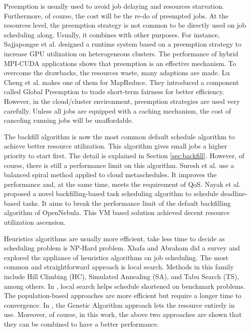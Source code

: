 \documentclass[sigchi]{acmart}
\begin{document}
Preemption is usually used to avoid job delaying and resources starvation. Furthermore, of course, the cost will be the re-do of preempted jobs. 
At the resources level, the preemption strategy is not common to be directly used on job scheduling along. Usually, it combines with other purposes.
For instance, Sajjapongse et al. \cite{sajjapongse2013preemption} designed a runtime system based on a preemption strategy to increase GPU utilization on heterogeneous clusters.
The performance of hybrid MPI-CUDA applications shows that preemption is an effective mechanism. 
To overcome the drawbacks, the resources waste, many adaptions are made. 
Lu Cheng et al. \cite{6103959} makes one of them for MapReduce. They introduced a component called Global Preemption to trade short-term fairness for better efficiency.
However, in the cloud/cluster environment, preemption strategies are used very carefully. Unless all jobs are equipped with a caching mechanism, the cost of canceling running jobs will be unaffordable.

The backfill algorithm is now the most common default schedule algorithm to achieve better resource utilization. 
This algorithm gives small jobs a higher priority to start first. The detail is explained in Section \ref{sec:backfill}.
However, of course, there is still a performance limit on this algorithm. 
Suresh et al. use a balanced spiral method applied to cloud metaschedules\cite{5972255}. It improves the performance and, at the same time, meets the requirement of QoS.
Nayak et al. proposed a novel backfilling-based task scheduling algorithm to schedule
deadline-based tasks\cite{nayak2019dynamic}. It aims to break the performance limit of the default backfilling algorithm of OpenNebula.
This VM based solution achieved decent resource utilization ascension.

Heuristics algorithms are usually more efficient, take less time to decide as scheduling problem is NP-Hard problem.
Xhafa and Abraham did a survey\cite{xhafa2010computational} and explored the appliance of heuristics algorithms on job scheduling. The most common and straightforward approach is local search.
Methods in this family include Hill Climbing (HC), Simulated Annealing (SA), and Tabu Search (TS), among others.
In \cite{ritchie2003fast}, local search helps schedule shortened on benchmark problems.
The population-based approaches are more efficient but require a longer time to convergence.
In \cite{abraham2000nature}, the Genetic Algorithm approach lets the resource entirely in use. 
Moreover, of course, in this work, the above two approaches are shown that they can be combined to have a better performance.  
\end{document}

